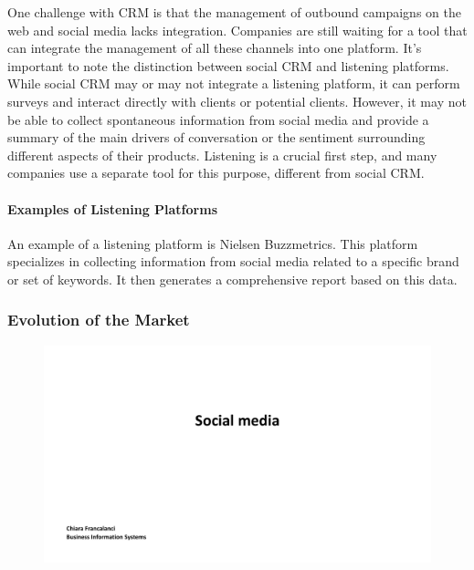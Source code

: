One challenge with CRM is that the management of outbound campaigns on
the web and social media lacks integration. Companies are still waiting
for a tool that can integrate the management of all these channels into
one platform. It's important to note the distinction between social CRM
and listening platforms. While social CRM may or may not integrate a
listening platform, it can perform surveys and interact directly with
clients or potential clients. However, it may not be able to collect
spontaneous information from social media and provide a summary of the
main drivers of conversation or the sentiment surrounding different
aspects of their products. Listening is a crucial first step, and many
companies use a separate tool for this purpose, different from social
CRM.

\paragraph{Examples of Listening
    Platforms}\label{examples-of-listening-platforms}

An example of a listening platform is Nielsen
Buzzmetrics. This platform specializes in collecting information from
social media related to a specific brand or set of keywords. It then
generates a comprehensive report based on this data.

\subsubsection{Evolution of the Market}\label{evolution-of-the-market}

\begin{figure}[!h]
    \centering
    \includegraphics[page=28, trim = 1.5cm 1.5cm 2.5cm 3.5cm, clip, width=\textwidth]{images/04 - Social_Media.pdf}
\end{figure}

